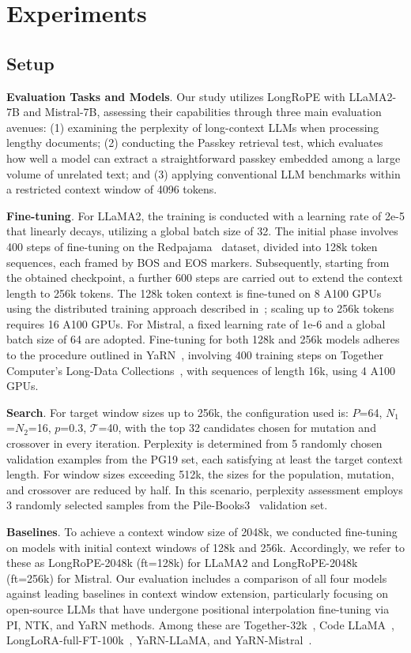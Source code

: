  \section{Experiments}

\label{sec:exp}
\subsection{Setup}
\textbf{Evaluation Tasks and Models}. Our study utilizes LongRoPE with LLaMA2-7B and Mistral-7B, assessing their capabilities through three main evaluation avenues: (1) examining the perplexity of long-context LLMs when processing lengthy documents; (2) conducting the Passkey retrieval test, which evaluates how well a model can extract a straightforward passkey embedded among a large volume of unrelated text; and (3) applying conventional LLM benchmarks within a restricted context window of 4096 tokens.

\textbf{Fine-tuning}. For LLaMA2, the training is conducted with a learning rate of 2e-5 that linearly decays, utilizing a global batch size of 32. The initial phase involves 400 steps of fine-tuning on the Redpajama~\cite{redpajama} dataset, divided into 128k token sequences, each framed by BOS and EOS markers. Subsequently, starting from the obtained checkpoint, a further 600 steps are carried out to extend the context length to 256k tokens. The 128k token context is fine-tuned on 8 A100 GPUs using the distributed training approach described in~\cite{cube}; scaling up to 256k tokens requires 16 A100 GPUs. For Mistral, a fixed learning rate of 1e-6 and a global batch size of 64 are adopted. Fine-tuning for both 128k and 256k models adheres to the procedure outlined in YaRN~\cite{yarn}, involving 400 training steps on Together Computer's Long-Data Collections~\cite{mistraldata}, with sequences of length 16k, using 4 A100 GPUs.

\textbf{Search}. For target window sizes up to 256k, the configuration used is: $P$=64, $N_1$=$N_2$=16, $p$=0.3, $\mathcal{T}$=40, with the top 32 candidates chosen for mutation and crossover in every iteration. Perplexity is determined from 5 randomly chosen validation examples from the PG19 set, each satisfying at least the target context length. For window sizes exceeding 512k, the sizes for the population, mutation, and crossover are reduced by half. In this scenario, perplexity assessment employs 3 randomly selected samples from the Pile-Books3~\cite{pile} validation set.

\textbf{Baselines}. To achieve a context window size of 2048k, we conducted fine-tuning on models with initial context windows of 128k and 256k. Accordingly, we refer to these as LongRoPE-2048k (ft=128k) for LLaMA2 and LongRoPE-2048k (ft=256k) for Mistral. Our evaluation includes a comparison of all four models against leading baselines in context window extension, particularly focusing on open-source LLMs that have undergone positional interpolation fine-tuning via PI, NTK, and YaRN methods. Among these are Together-32k~\cite{together}, Code LLaMA~\cite{codellama}, LongLoRA-full-FT-100k~\cite{longlora}, YaRN-LLaMA, and YaRN-Mistral~\cite{yarn}.

